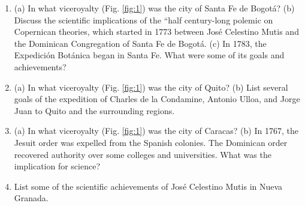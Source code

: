 \documentclass[12pt]{article}
\begin{document}
\begin{enumerate}
\item (a) In what viceroyalty (Fig. \ref{fig:1}) was the city of Santa Fe de Bogot\'{a}? (b) Discuss the scientific implications of the ``half century-long polemic on Copernican theories, which started in 1773 between Jos\'{e} Celestino Mutis and the Dominican Congregation of Santa Fe de Bogot\'{a}. (c) In 1783, the Expedici\'{o}n Bot\'{a}nica began in Santa Fe.  What were some of its goals and achievements? \\ \vspace{2cm}
\item (a) In what viceroyalty (Fig. \ref{fig:1}) was the city of Quito? (b) List several goals of the expedition of Charles de la Condamine, Antonio Ulloa, and Jorge Juan to Quito and the surrounding regions. \\ \vspace{2cm}
\item (a) In what viceroyalty (Fig. \ref{fig:1}) was the city of Caracas? (b) In 1767, the Jesuit order was expelled from the Spanish colonies.  The Dominican order recovered authority over some colleges and universities.  What was the implication for science? \\ \vspace{2cm}
\item List some of the scientific achievements of Jos\'{e} Celestino Mutis in Nueva Granada.
\end{enumerate}
\end{document}
